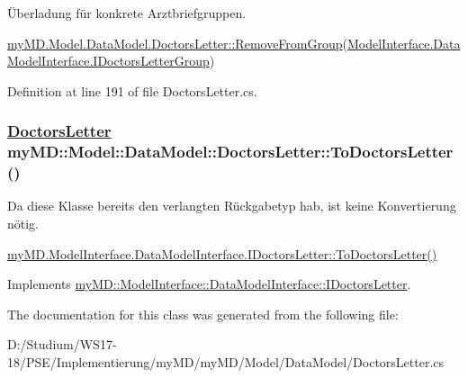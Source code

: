 \"{U}berladung f\"{u}r konkrete Arztbriefgruppen. 

\hyperlink{classmy_m_d_1_1_model_1_1_data_model_1_1_doctors_letter_7f55c973858b86b4f86b78d8b55ccd4e}{my\-MD.Model.Data\-Model.Doctors\-Letter::Remove\-From\-Group}(\hyperlink{interfacemy_m_d_1_1_model_interface_1_1_data_model_interface_1_1_i_doctors_letter_group}{Model\-Interface.Data\-Model\-Interface.IDoctors\-Letter\-Group}) 

Definition at line 191 of file Doctors\-Letter.cs.\hypertarget{classmy_m_d_1_1_model_1_1_data_model_1_1_doctors_letter_a52c06afbc0038d351f09b083e586b2e}{
\subsubsection[ToDoctorsLetter]{\setlength{\rightskip}{0pt plus 5cm}\hyperlink{classmy_m_d_1_1_model_1_1_data_model_1_1_doctors_letter}{Doctors\-Letter} my\-MD::Model::Data\-Model::Doctors\-Letter::To\-Doctors\-Letter ()}}
\label{dc/d86/classmy_m_d_1_1_model_1_1_data_model_1_1_doctors_letter_a52c06afbc0038d351f09b083e586b2e}


Da diese Klasse bereits den verlangten R\"{u}ckgabetyp hab, ist keine Konvertierung n\"{o}tig. 

\hyperlink{interfacemy_m_d_1_1_model_interface_1_1_data_model_interface_1_1_i_doctors_letter_a52c06afbc0038d351f09b083e586b2e}{my\-MD.Model\-Interface.Data\-Model\-Interface.IDoctors\-Letter::To\-Doctors\-Letter()} 

Implements \hyperlink{interfacemy_m_d_1_1_model_interface_1_1_data_model_interface_1_1_i_doctors_letter_a52c06afbc0038d351f09b083e586b2e}{my\-MD::Model\-Interface::Data\-Model\-Interface::IDoctors\-Letter}.

The documentation for this class was generated from the following file:\begin{CompactItemize}
\item 
D:/Studium/WS17-18/PSE/Implementierung/my\-MD/my\-MD/Model/Data\-Model/Doctors\-Letter.cs\end{CompactItemize}
